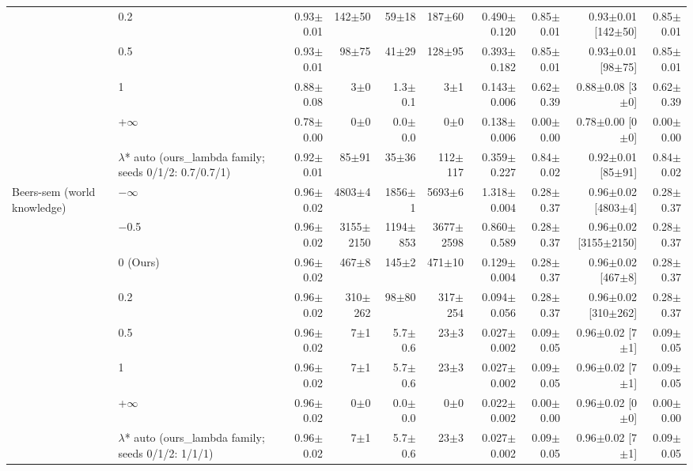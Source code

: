 {\begin{longtable}{llrrrrrrrr}
 & 0.2 & 0.93$\pm$0.01 & 142$\pm$50 & 59$\pm$18 & 187$\pm$60 & 0.490$\pm$0.120 & 0.85$\pm$0.01 & 0.93$\pm$0.01 [142$\pm$50] & 0.85$\pm$0.01 \\
 & 0.5 & 0.93$\pm$0.01 & 98$\pm$75 & 41$\pm$29 & 128$\pm$95 & 0.393$\pm$0.182 & 0.85$\pm$0.01 & 0.93$\pm$0.01 [98$\pm$75] & 0.85$\pm$0.01 \\
 & 1 & 0.88$\pm$0.08 & 3$\pm$0 & 1.3$\pm$0.1 & 3$\pm$1 & 0.143$\pm$0.006 & 0.62$\pm$0.39 & 0.88$\pm$0.08 [3$\pm$0] & 0.62$\pm$0.39 \\
 & +$\infty$ & 0.78$\pm$0.00 & 0$\pm$0 & 0.0$\pm$0.0 & 0$\pm$0 & 0.138$\pm$0.006 & 0.00$\pm$0.00 & 0.78$\pm$0.00 [0$\pm$0] & 0.00$\pm$0.00 \\
 & $\lambda$* auto (ours\_lambda family; seeds 0/1/2: 0.7/0.7/1) & 0.92$\pm$0.01 & 85$\pm$91 & 35$\pm$36 & 112$\pm$117 & 0.359$\pm$0.227 & 0.84$\pm$0.02 & 0.92$\pm$0.01 [85$\pm$91] & 0.84$\pm$0.02 \\
\midrule
Beers-sem (world knowledge) & $-$$\infty$ & 0.96$\pm$0.02 & 4803$\pm$4 & 1856$\pm$1 & 5693$\pm$6 & 1.318$\pm$0.004 & 0.28$\pm$0.37 & 0.96$\pm$0.02 [4803$\pm$4] & 0.28$\pm$0.37 \\
 & $-$0.5 & 0.96$\pm$0.02 & 3155$\pm$2150 & 1194$\pm$853 & 3677$\pm$2598 & 0.860$\pm$0.589 & 0.28$\pm$0.37 & 0.96$\pm$0.02 [3155$\pm$2150] & 0.28$\pm$0.37 \\
 & 0 (Ours) & 0.96$\pm$0.02 & 467$\pm$8 & 145$\pm$2 & 471$\pm$10 & 0.129$\pm$0.004 & 0.28$\pm$0.37 & 0.96$\pm$0.02 [467$\pm$8] & 0.28$\pm$0.37 \\
 & 0.2 & 0.96$\pm$0.02 & 310$\pm$262 & 98$\pm$80 & 317$\pm$254 & 0.094$\pm$0.056 & 0.28$\pm$0.37 & 0.96$\pm$0.02 [310$\pm$262] & 0.28$\pm$0.37 \\
 & 0.5 & 0.96$\pm$0.02 & 7$\pm$1 & 5.7$\pm$0.6 & 23$\pm$3 & 0.027$\pm$0.002 & 0.09$\pm$0.05 & 0.96$\pm$0.02 [7$\pm$1] & 0.09$\pm$0.05 \\
 & 1 & 0.96$\pm$0.02 & 7$\pm$1 & 5.7$\pm$0.6 & 23$\pm$3 & 0.027$\pm$0.002 & 0.09$\pm$0.05 & 0.96$\pm$0.02 [7$\pm$1] & 0.09$\pm$0.05 \\
 & +$\infty$ & 0.96$\pm$0.02 & 0$\pm$0 & 0.0$\pm$0.0 & 0$\pm$0 & 0.022$\pm$0.002 & 0.00$\pm$0.00 & 0.96$\pm$0.02 [0$\pm$0] & 0.00$\pm$0.00 \\
 & $\lambda$* auto (ours\_lambda family; seeds 0/1/2: 1/1/1) & 0.96$\pm$0.02 & 7$\pm$1 & 5.7$\pm$0.6 & 23$\pm$3 & 0.027$\pm$0.002 & 0.09$\pm$0.05 & 0.96$\pm$0.02 [7$\pm$1] & 0.09$\pm$0.05 \\
\end{longtable}
}
